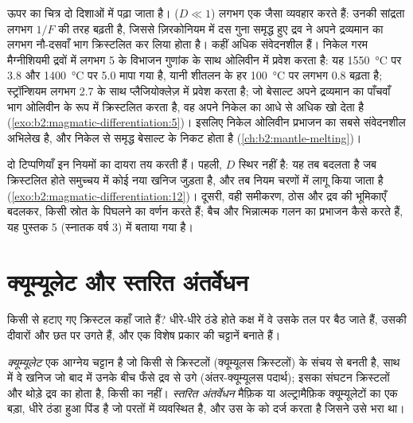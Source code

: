 ऊपर का चित्र दो दिशाओं में पढ़ा जाता है।  ($D \ll 1$) लगभग
एक जैसा व्यवहार करते हैं: उनकी सांद्रता लगभग $1/F$ की तरह बढ़ती है, जिससे ज़िरकोनियम में
दस गुना समृद्ध हुए द्रव ने अपने द्रव्यमान का लगभग नौ-दसवाँ भाग क्रिस्टलित कर लिया होता है।  कहीं अधिक संवेदनशील हैं। निकेल गरम मैग्नीशियमी द्रवों में लगभग 5 के विभाजन
गुणांक के साथ ओलिवीन में प्रवेश करता है: यह \qty{1550}{\celsius} पर 3.8 और
\qty{1400}{\celsius} पर 5.0 मापा गया है, यानी शीतलन के हर \qty{100}{\celsius} पर लगभग 0.8
बढ़ता है; स्ट्रॉन्शियम लगभग 2.7 के साथ
प्लैजियोक्लेज़ में प्रवेश करता है; जो बेसाल्ट अपने द्रव्यमान का पाँचवाँ भाग ओलिवीन के रूप में
क्रिस्टलित करता है, वह अपने निकेल का आधे से अधिक खो देता है (\cref{exo:b2:magmatic-differentiation:5})। इसलिए निकेल
ओलिवीन प्रभाजन का सबसे संवेदनशील अभिलेख है, और निकेल से समृद्ध बेसाल्ट
 के निकट होता है (\cref{ch:b2:mantle-melting})।

दो टिप्पणियाँ इन नियमों का दायरा तय करती हैं। पहली, $D$ स्थिर नहीं है: यह
तब बदलता है जब क्रिस्टलित होते समुच्चय में कोई नया खनिज जुड़ता है, और तब नियम
चरणों में लागू किया जाता है (\cref{exo:b2:magmatic-differentiation:12})। दूसरी, वही समीकरण, ठोस और
द्रव की भूमिकाएँ बदलकर, किसी स्रोत के पिघलने का वर्णन करते हैं; बैच और भिन्नात्मक
गलन  का प्रभाजन कैसे करते हैं, यह पुस्तक 5 (स्नातक वर्ष 3) में बताया गया है।

\section{क्यूम्यूलेट और स्तरित अंतर्वेधन}\label{sec:b2:magmatic-differentiation:cumulates}

किसी  से हटाए गए क्रिस्टल कहाँ जाते हैं? धीरे-धीरे ठंडे होते  कक्ष में
वे उसके तल पर बैठ जाते हैं, उसकी दीवारों और छत पर उगते हैं, और एक विशेष प्रकार की
चट्टानें बनाते हैं।

\begin{definition}[क्यूम्यूलेट; स्तरित अंतर्वेधन]\label{def:b2:magmatic-differentiation:cumulate}
\emph{क्यूम्यूलेट} एक आग्नेय चट्टान है जो किसी  से क्रिस्टलों (क्यूम्यूलस
क्रिस्टलों) के संचय से बनती है, साथ में वे खनिज जो बाद में उनके बीच फँसे द्रव से
उगे (अंतर-क्यूम्यूलस पदार्थ); इसका संघटन
क्रिस्टलों और थोड़े द्रव का होता है, किसी  का नहीं।
\emph{स्तरित अंतर्वेधन} मैफ़िक या अल्ट्रामैफ़िक क्यूम्यूलेटों का
एक बड़ा, धीरे ठंडा हुआ पिंड है जो परतों में व्यवस्थित है, और उस  के  को दर्ज करता है जिसने उसे भरा था।
\end{definition}

